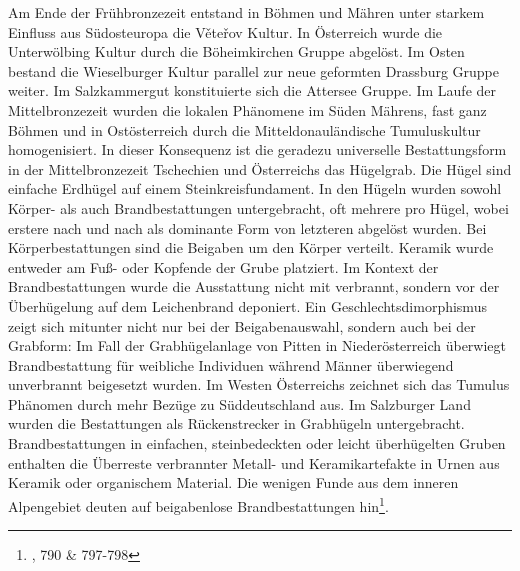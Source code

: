 \documentclass[openany,twoside,twocolumn]{book}
\let\rmarkdownfootnote\footnote%
\def\footnote{\protect\rmarkdownfootnote}
\begin{document}
Am Ende der Frühbronzezeit entstand in Böhmen und Mähren unter starkem Einfluss aus Südosteuropa die Věteřov Kultur. In Österreich wurde die Unterwölbing Kultur durch die Böheimkirchen Gruppe abgelöst. Im Osten bestand die Wieselburger Kultur parallel zur neue geformten Drassburg Gruppe weiter. Im Salzkammergut konstituierte sich die Attersee Gruppe. Im Laufe der Mittelbronzezeit wurden die lokalen Phänomene im Süden Mährens, fast ganz Böhmen und in Ostösterreich durch die Mitteldonauländische Tumuluskultur homogenisiert. In dieser Konsequenz ist die geradezu universelle Bestattungsform in der Mittelbronzezeit Tschechien und Österreichs das Hügelgrab. Die Hügel sind einfache Erdhügel auf einem Steinkreisfundament. In den Hügeln wurden sowohl Körper- als auch Brandbestattungen untergebracht, oft mehrere pro Hügel, wobei erstere nach und nach als dominante Form von letzteren abgelöst wurden. Bei Körperbestattungen sind die Beigaben um den Körper verteilt. Keramik wurde entweder am Fuß- oder Kopfende der Grube platziert. Im Kontext der Brandbestattungen wurde die Ausstattung nicht mit verbrannt, sondern vor der Überhügelung auf dem Leichenbrand deponiert. Ein Geschlechtsdimorphismus zeigt sich mitunter nicht nur bei der Beigabenauswahl, sondern auch bei der Grabform: Im Fall der Grabhügelanlage von Pitten in Niederösterreich überwiegt Brandbestattung für weibliche Individuen während Männer überwiegend unverbrannt beigesetzt wurden. Im Westen Österreichs zeichnet sich das Tumulus Phänomen durch mehr Bezüge zu Süddeutschland aus. Im Salzburger Land wurden die Bestattungen als Rückenstrecker in Grabhügeln untergebracht. Brandbestattungen in einfachen, steinbedeckten oder leicht überhügelten Gruben enthalten die Überreste verbrannter Metall- und Keramikartefakte in Urnen aus Keramik oder organischem Material. Die wenigen Funde aus dem inneren Alpengebiet deuten auf beigabenlose Brandbestattungen hin\footnote{\textcite{lubos_czech_2013}, 790 \& 797-798}.
\end{document}
